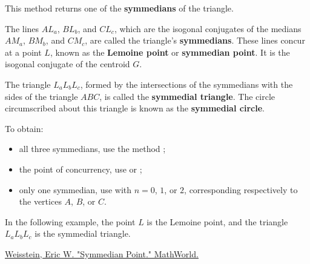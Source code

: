 This method returns one of the \textbf{symmedians} of the triangle.

\medskip
\noindent
The lines $AL_a$, $BL_b$, and $CL_c$, which are the isogonal conjugates of the medians $AM_a$, $BM_b$, and $CM_c$, are called the triangle’s \textbf{symmedians}. These lines concur at a point $L$, known as the \textbf{Lemoine point} or \textbf{symmedian point}. It is the isogonal conjugate of the centroid $G$.

\medskip
\noindent
The triangle $L_aL_bL_c$, formed by the intersections of the symmedians with the sides of the triangle $ABC$, is called the \textbf{symmedial triangle}. The circle circumscribed about this triangle is known as the \textbf{symmedial circle}.

\medskip
\noindent
To obtain:
\begin{itemize}
  \item all three symmedians, use the method ;
  \item the point of concurrency, use  or ;
  \item only one symmedian, use  with \(n=0\), \(1\), or \(2\), corresponding respectively to the vertices $A$, $B$, or $C$.
\end{itemize}

\medskip
\noindent
In the following example, the point $L$ is the Lemoine point, and the triangle $L_aL_bL_c$ is the symmedial triangle.

\begin{flushright}
\small
\href{https://mathworld.wolfram.com/SymmedianPoint.html}{Weisstein, Eric W. "Symmedian Point." MathWorld.}
\end{flushright}

\vspace{1em}

